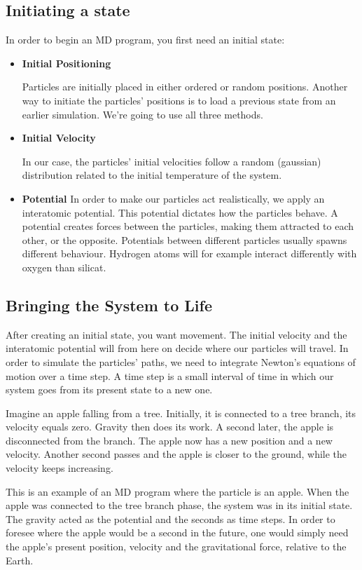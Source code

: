 \documentclass[10pt, a4paper]{report}
\begin{document}
\subsection*{Initiating a state}
In order to begin an MD program, you first need an initial state:
\begin{itemize}
 \item {\bf{Initial Positioning}}
 
Particles are initially placed in either ordered or random positions.
Another way to initiate the particles' positions is to load a previous state from an earlier simulation.
We're going to use all three methods.
\item {\bf{Initial Velocity}}

In our case, the particles' initial velocities follow a random (gaussian) distribution related to the initial temperature of the system.
\item {\bf{Potential}}
In order to make our particles act realistically, we apply an interatomic potential. 
This potential dictates how the particles behave. A potential creates forces between the particles, 
making them attracted to each other, or the opposite.
Potentials between different particles usually spawns different behaviour. 
Hydrogen atoms will for example interact differently with oxygen than silicat.
\end{itemize}
\subsection*{Bringing the System to Life}
After creating an initial state, you want movement. The initial velocity and the interatomic 
potential will from here on decide where our particles will travel. In order to simulate the particles' paths,
we need to integrate Newton's equations of motion over a time step. A time step is a small interval of time in 
which our system goes from its present state to a new one. 

Imagine an apple falling from a tree. Initially, it is connected to a tree branch, its velocity equals zero.
Gravity then does its work.
A second later, the apple is disconnected from the branch. The apple now has a new position and a new velocity.
Another second passes and the apple is closer to the ground, while the velocity keeps increasing.

This is an example of an MD program where the particle is an apple. 
When the apple was connected to the tree branch phase, the system was in its initial state. 
The gravity acted as the potential and the seconds as time steps. In order to foresee where the apple 
would be a second in the future, one would simply need the apple's present position, velocity and the gravitational force, 
relative to the Earth.
\end{document}
